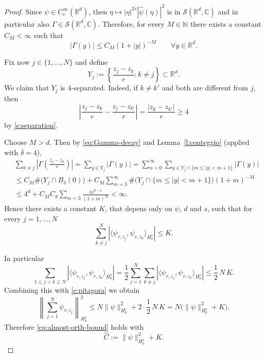 \documentclass[12pt,a4paper,oneside]{amsart}
\theoremstyle{plain}
\theoremstyle{definition}
\numberwithin{equation}{section}
\numberwithin{figure}{section}
\numberwithin{table}{section}
\theoremstyle{remark}
\newcommand{\R}{\mathbb{R}}
\newcommand{\N}{\mathbb{N}}
\newcommand{\Fhat}[1]{\widehat{#1}}
\begin{document}
\begin{proof}
Since $\psi\in C_c^\infty(\R^d)$, then $\eta\mapsto |\eta|^{2s}|\widehat\psi(\eta)|^2$ is in $\mathcal{S}(\R^d,\mathbb{C})$ and in particular also $\Gamma \in \mathcal S(\R^d,\mathbb{C})$. Therefore, for every $M\in \N$ there exists a constant $C_M<\infty$ such that
\begin{equation}\label{eq:Gamma-decay}
|\Gamma(y)|\le C_M(1+|y|)^{-M}\qquad\forall y\in\R^d.
\end{equation}

Fix now $j\in\{1,\dots,N\}$ and define
\begin{equation*}
Y_j:=\left\{\frac{z_j-z_k}{r}:k\neq j\right\}\subset\R^d.    
\end{equation*}
We claim that $Y_j$ is $4$-separated. Indeed, if $k\neq k'$ and both are different from $j$, then
\begin{equation*}
\left|\frac{z_j-z_k}{r}-\frac{z_j-z_{k'}}{r}
\right|
=
\frac{|z_k-z_{k'}|}{r}
\ge 4    
\end{equation*}
by \eqref{e:separation}. 

Choose $M>d$. Then by \eqref{eq:Gamma-decay} and Lemma~\ref{l:conteggio} (applied with $\delta=4$),
\begin{align*}
  &  \sum_{k\neq j}
\left|
\Gamma\left(\frac{z_j-z_k}{r}\right)
\right|
=
\sum_{y\in Y_j} |\Gamma(y)|=\sum_{n=0}^\infty
\sum_{y\in Y_j\cap\{m\le |y|<m+1\}} |\Gamma(y)| \\ & \leq  C_M\#\bigl(Y_j\cap B_3(0)\bigr)+  C_M
\sum_{m=3}^\infty
\#\bigl(Y_j\cap\{m\le |y|<m+1\}\bigr)(1+m)^{-M} \\ & \leq 4^d+ C_MC_d \sum_{m=3} \frac{m^{d-1}}{(1+m)^M}<\infty.
\end{align*}
 Hence there exists a constant $K$, that depens only on $\psi$, $d$ and $s$, such that for every $j=1,\dots,N$
\begin{equation*}
\sum_{k\neq j}^N
\left|
\langle \psi_{r,z_j},\psi_{r,z_k}\rangle_{H_0^s}
\right|
\le K.
\end{equation*}

In particular
\begin{equation*}
\sum_{1\le j<k\le N}
\left|
\langle \psi_{r,z_j},\psi_{r,z_k}\rangle_{H_0^s}
\right|
=
\frac12
\sum_{j=1}^N
\sum_{k\neq j}
\left|
\langle \psi_{r,z_j},\psi_{r,z_k}\rangle_{H_0^s}
\right|
\le
\frac12\,N\,K.    
\end{equation*}
Combining this with \eqref{e:pitagora} we obtain
\begin{equation*}
\left\|\sum_{j=1}^N \psi_{r,z_j}\right\|_{H_0^s}^2
\le
N\|\psi\|_{H_0^s}^2 + 2\cdot \frac12\,N\,K
=
N\bigl(\|\psi\|_{H_0^s}^2 + K\bigr).    
\end{equation*}
Therefore \eqref{eq:almost-orth-bound} holds with
\begin{equation*}
\Fhat{C}:=\|\psi\|_{H_0^s}^2 + K.    
\end{equation*}
\end{proof}
\end{document}
